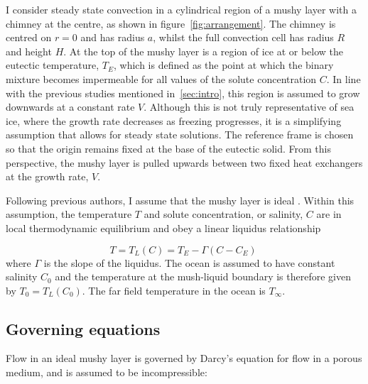 \documentclass[11pt]{proc}
\begin{document}
I consider steady state convection in a cylindrical region of a mushy layer with a chimney at the centre, as shown in figure~\ref{fig:arrangement}. The chimney is centred on $r=0$ and has radius $a$, whilst the full convection cell has radius $R$ and height $H$. At the top of the mushy layer is a region of ice at or below the eutectic temperature, $T_E$, which is defined as the point at which the binary mixture becomes impermeable for all values of the solute concentration $C$. In line with the previous studies mentioned in~\autoref{sec:intro}, this region is assumed to grow downwards at a constant rate $V$. Although this is not truly representative of sea ice, where the growth rate decreases as freezing progresses, it is a simplifying assumption that allows for steady state solutions. The reference frame is chosen so that the origin remains fixed at the base of the eutectic solid. From this perspective, the mushy layer is pulled upwards between two fixed heat exchangers at the growth rate, $V$.

Following previous authors, I assume that the mushy layer is ideal \citep*{worster-97}. Within this assumption, the temperature $T$ and solute concentration, or salinity, $C$ are in local thermodynamic equilibrium and obey a linear liquidus relationship

\begin{equation}
\label{eq:liquidus}
T = T_L(C) = T_E  - \Gamma (C-C_E) \;
\end{equation}
where $\Gamma$ is the slope of the liquidus. The ocean is assumed to have constant salinity $C_0$ and the temperature at the mush-liquid boundary is therefore given by $T_0 = T_L(C_0)$. The far field temperature in the ocean is $T_\infty$.

\subsection{Governing equations}
Flow in an ideal mushy layer is governed by Darcy's equation for flow in a porous medium, and is assumed to be incompressible:
\end{document}
